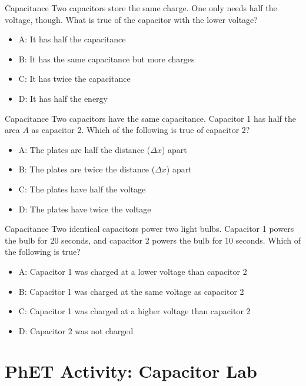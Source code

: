 \documentclass{beamer}
\begin{document}
\begin{frame}{Capacitance}
Two capacitors store the same charge.  One only needs half the voltage, though.  What is true of the capacitor with the lower voltage?
\begin{itemize}
\item A: It has half the capacitance
\item B: It has the same capacitance but more charges
\item C: It has twice the capacitance
\item D: It has half the energy
\end{itemize}
\end{frame}

\begin{frame}{Capacitance}
Two capacitors have the same capacitance.  Capacitor 1 has half the area $A$ as capacitor 2.  Which of the following is true of capacitor 2?
\begin{itemize}
\item A: The plates are half the distance ($\Delta x$) apart
\item B: The plates are twice the distance ($\Delta x$) apart
\item C: The plates have half the voltage
\item D: The plates have twice the voltage
\end{itemize}
\end{frame}

\begin{frame}{Capacitance}
Two identical capacitors power two light bulbs.  Capacitor 1 powers the bulb for 20 seconds, and capacitor 2 powers the bulb for 10 seconds.  Which of the following is true?
\begin{itemize}
\item A: Capacitor 1 was charged at a lower voltage than capacitor 2
\item B: Capacitor 1 was charged at the same voltage as capacitor 2
\item C: Capacitor 1 was charged at a higher voltage than capacitor 2
\item D: Capacitor 2 was not charged
\end{itemize}
\end{frame}

\section{PhET Activity: Capacitor Lab}
\end{document}

